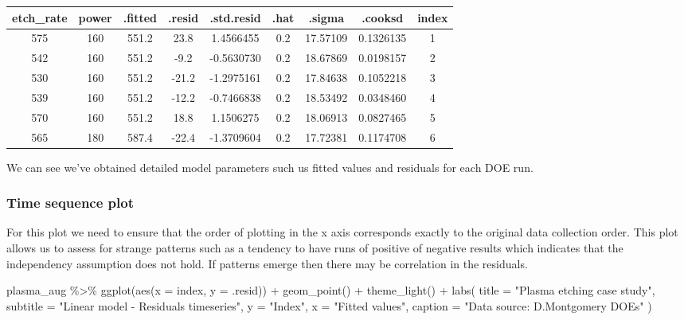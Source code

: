 \documentclass[
]{book}
\newenvironment{Shaded}{\begin{snugshade}}{\end{snugshade}}
\newcommand{\AttributeTok}[1]{\textcolor[rgb]{0.77,0.63,0.00}{#1}}
\newcommand{\FunctionTok}[1]{\textcolor[rgb]{0.00,0.00,0.00}{#1}}
\newcommand{\NormalTok}[1]{#1}
\newcommand{\SpecialCharTok}[1]{\textcolor[rgb]{0.00,0.00,0.00}{#1}}
\newcommand{\StringTok}[1]{\textcolor[rgb]{0.31,0.60,0.02}{#1}}
\begin{document}
\begin{tabular}{c|c|c|c|c|c|c|c|c}
\hline
etch\_rate & power & .fitted & .resid & .std.resid & .hat & .sigma & .cooksd & index\\
\hline
575 & 160 & 551.2 & 23.8 & 1.4566455 & 0.2 & 17.57109 & 0.1326135 & 1\\
\hline
542 & 160 & 551.2 & -9.2 & -0.5630730 & 0.2 & 18.67869 & 0.0198157 & 2\\
\hline
530 & 160 & 551.2 & -21.2 & -1.2975161 & 0.2 & 17.84638 & 0.1052218 & 3\\
\hline
539 & 160 & 551.2 & -12.2 & -0.7466838 & 0.2 & 18.53492 & 0.0348460 & 4\\
\hline
570 & 160 & 551.2 & 18.8 & 1.1506275 & 0.2 & 18.06913 & 0.0827465 & 5\\
\hline
565 & 180 & 587.4 & -22.4 & -1.3709604 & 0.2 & 17.72381 & 0.1174708 & 6\\
\hline
\end{tabular}

We can see we've obtained detailed model parameters such us fitted values and residuals for each DOE run.

\hypertarget{time-sequence-plot}{%
\subsubsection{Time sequence plot}\label{time-sequence-plot}}

For this plot we need to ensure that the order of plotting in the x axis corresponds exactly to the original data collection order. This plot allows us to assess for strange patterns such as a tendency to have runs of positive of negative results which indicates that the independency assumption does not hold. If patterns emerge then there may be correlation in the residuals.

\begin{Shaded}
\begin{Highlighting}[]
\NormalTok{plasma\_aug }\SpecialCharTok{\%\textgreater{}\%}
  \FunctionTok{ggplot}\NormalTok{(}\FunctionTok{aes}\NormalTok{(}\AttributeTok{x =}\NormalTok{ index, }\AttributeTok{y =}\NormalTok{ .resid)) }\SpecialCharTok{+}
  \FunctionTok{geom\_point}\NormalTok{() }\SpecialCharTok{+}
  \FunctionTok{theme\_light}\NormalTok{() }\SpecialCharTok{+}
  \FunctionTok{labs}\NormalTok{(}
    \AttributeTok{title =} \StringTok{"Plasma etching case study"}\NormalTok{,}
    \AttributeTok{subtitle =} \StringTok{"Linear model {-} Residuals timeseries"}\NormalTok{,}
    \AttributeTok{y =} \StringTok{"Index"}\NormalTok{,}
    \AttributeTok{x =} \StringTok{"Fitted values"}\NormalTok{,}
    \AttributeTok{caption =} \StringTok{"Data source: D.Montgomery DOEs"}
\NormalTok{  )}
\end{Highlighting}
\end{Shaded}
\end{document}
